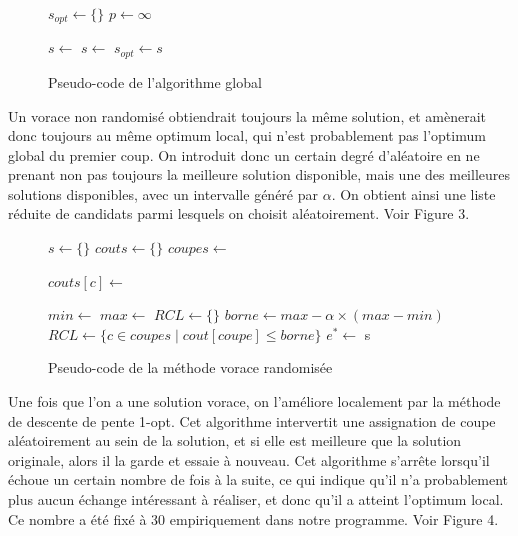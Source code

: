 \documentclass[10pt,a4paper]{article}
\begin{document}
\begin{figure}[h!]
\begin{algorithmic}

	\State $s_{opt}\gets \{\}$
	\State $p \gets \infty$
	
		\State $s \gets $ 
		\State $s \gets $ 
			\State $s_{opt}\gets s$
			\State {}
		\EndIf
	\EndWhile
\EndFunction

\end{algorithmic}
\caption{Pseudo-code de l'algorithme global}
\end{figure}

Un vorace non randomisé obtiendrait toujours la même solution, et amènerait donc toujours au même optimum local, qui n'est probablement pas l'optimum global du premier coup.
On introduit donc un certain degré d'aléatoire en ne prenant non pas toujours la meilleure solution disponible, mais une des meilleures solutions disponibles, avec un intervalle généré par $ \alpha $. On obtient ainsi une liste réduite de candidats parmi lesquels on choisit aléatoirement. Voir Figure 3.

\newpage

\begin{figure}[h!]
\begin{algorithmic}
	\State $s \gets \{\}$
	\State $couts \gets \{\}$
	\State $coupes \gets $ 
	
		\State $couts[c] \gets $ 
	\EndFor
	
		\State $min \gets $ 
		\State $max \gets $ 
		\State $RCL \gets \{\}$
		\State $borne \gets max - \alpha \times (max - min) $
		\State $RCL \gets \{c \in coupes \mid cout[coupe] \leq borne\} $
		\State $e^{*} \gets $ 
		\State {}
		\State {}
		\State {}
	\EndFor	
	\State \Return s
\EndFunction

\end{algorithmic}
\caption{Pseudo-code de la méthode vorace randomisée}
\end{figure}

Une fois que l'on a une solution vorace, on l'améliore localement par la méthode de descente de pente 1-opt. Cet algorithme intervertit une assignation de coupe aléatoirement au sein de la solution, et si elle est meilleure que la solution originale, alors il la garde et essaie à nouveau.
Cet algorithme s'arrête lorsqu'il échoue un certain nombre de fois à la suite, ce qui indique qu'il n'a probablement plus aucun échange intéressant à réaliser, et donc qu'il a atteint l'optimum local. Ce nombre a été fixé à 30 empiriquement dans notre programme. Voir Figure 4.
\end{document}
